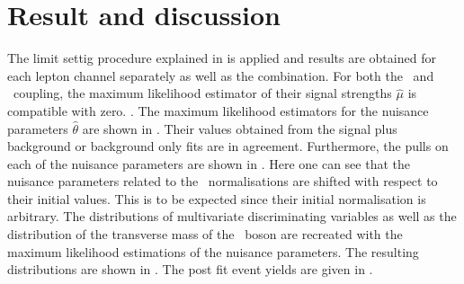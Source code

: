 \section{Result and discussion}
The limit settig procedure explained in  is applied and results are obtained for each lepton channel separately as well as the combination. For both the \Zut\ and \Zct\ coupling, the maximum likelihood estimator of their signal strengths $\hat{\mu}$ is compatible with zero. . The maximum likelihood estimators for the nuisance parameters $\hat{\theta}$ are shown in . Their values obtained from the signal plus background or background only fits are in agreement. Furthermore, the pulls on each of the nuisance parameters are shown in . Here one can see that the nuisance parameters related to the \NPL\ normalisations are shifted with respect to their initial values. This is to be expected since their initial  normalisation is arbitrary. The distributions of multivariate discriminating  variables as well as the distribution of the transverse mass of the \PW\ boson are recreated with the maximum likelihood estimations of the nuisance parameters. The resulting distributions are shown in . The post fit event yields are given in . 






